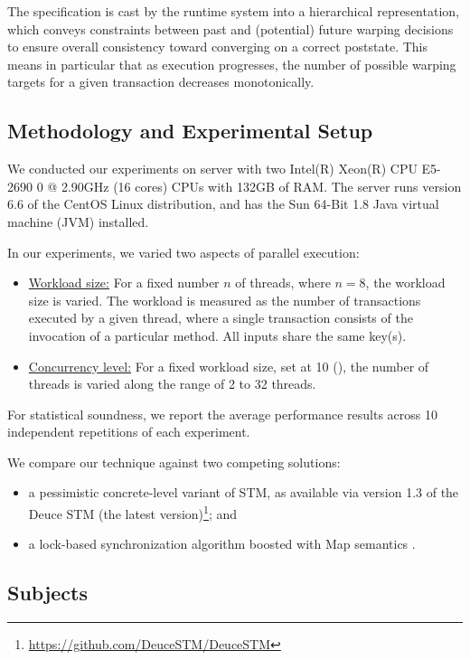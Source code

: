 The specification is cast by the runtime system into a hierarchical representation, which conveys constraints between past and (potential) future warping decisions to ensure overall consistency toward converging on a correct poststate. This means in particular that as execution progresses, the number of possible warping targets for a given transaction decreases monotonically.

\subsection{Methodology and Experimental Setup}

We conducted our experiments on server with two Intel(R) Xeon(R) CPU E5-2690 0 @ 2.90GHz (16 cores) CPUs with 132GB of RAM. The server runs version
6.6 of the CentOS Linux distribution, and has the Sun 64-Bit 1.8 Java virtual machine (JVM) installed.

In our experiments, we varied two aspects of parallel execution:
\begin{itemize}
	\item \underline{Workload size:} For a fixed number $n$ of threads, where $n=8$,  the workload size is varied. The workload is measured as the number of transactions executed by a given thread, where a single transaction consists of the invocation of a particular method. All inputs share the same key(s).
	\item \underline{Concurrency level:} For a fixed workload size, set at 10 (), the number of threads is varied along the range of 2 to 32 threads.  
\end{itemize}
For statistical soundness, we report the average performance results across 10 independent repetitions of each experiment.

We compare our technique against two competing solutions:
\begin{itemize}
	\item a pessimistic concrete-level variant of STM, as available via version 1.3 of the Deuce STM (the latest version)\footnote{
		\url{https://github.com/DeuceSTM/DeuceSTM}
	}; and
	\item a lock-based synchronization algorithm boosted with {\sf Map} semantics \cite{ppopp/HerlihyK08}.
\end{itemize}

\subsection{Subjects}

